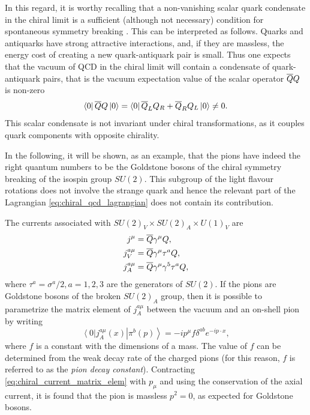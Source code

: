 In this regard, it is worthy recalling that a non-vanishing scalar quark condensate in the chiral limit is a sufficient (although not necessary) condition for spontaneous symmetry breaking \cite{Scherer:2002tk}. This can be interpreted as follows. Quarks and antiquarks have strong attractive interactions, and, if they are massless, the energy cost of creating a new quark-antiquark pair is small. Thus one expects that the vacuum of QCD in the chiral limit will contain a condensate of quark-antiquark pairs, that is the vacuum expectation value of the scalar operator $\overline{Q} Q$ is non-zero
\begin{equation}
  \left\langle 0 \right\vert \overline{Q} Q \left\vert 0 \right\rangle = \left\langle 0 \right\vert \overline{Q}_L Q_R + \overline{Q}_R Q_L \left\vert 0 \right\rangle \neq 0 .
\end{equation}
This scalar condensate is not invariant under chiral transformations, as it couples quark components with opposite chirality.

In the following, it will be shown, as an example, that the pions have indeed the right quantum numbers to be the Goldstone bosons of the chiral symmetry breaking of the isospin group $SU(2)$. This subgroup of the light flavour rotations does not involve the strange quark and hence the relevant part of the Lagrangian \eqref{eq:chiral_qcd_lagrangian} does not contain its contribution.

The currents associated with $SU(2)_V \times SU(2)_A \times U(1)_V$ are
\begin{subequations}
  \begin{align}
    j^\mu &= \overline{Q} \gamma^\mu Q , \\
    j^{a \mu}_V &= \overline{Q} \gamma^\mu \tau^a Q , \\ 
    j^{a \mu}_A &= \overline{Q} \gamma^\mu \gamma^5 \tau^a Q , 
  \end{align}
\end{subequations}
where $\tau^a = \sigma^a / 2, a = 1, 2, 3$ are the generators of $SU(2)$. If the pions are Goldstone bosons of the broken $SU(2)_A$ group, then it is possible to parametrize the matrix element of $j^{a \mu}_A$ between the vacuum and an on-shell pion by writing
\begin{equation}
  \left\langle 0 \right\vert j^{a \mu}_A (x) \left\vert \pi^b (p) \right\rangle = - i p^\mu f \delta^{a b} e^{- i p \cdot x} ,
  \label{eq:chiral_current_matrix_elem}
\end{equation}
where $f$ is a constant with the dimensions of a mass. The value of $f$ can be determined from the weak decay rate of the charged pions (for this reason, $f$ is referred to as the \emph{pion decay constant}). Contracting \eqref{eq:chiral_current_matrix_elem} with $p_\mu$ and using the conservation of the axial current, it is found that the pion is massless $p^2 = 0$, as expected for Goldstone bosons.

